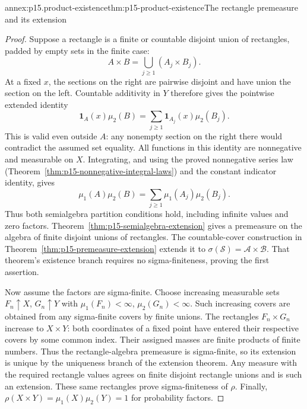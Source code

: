 \begin{annexitem}{annex:p15.product-existence}{thm:p15-product-existence}{The rectangle premeasure and its extension}
\begin{proof}
Suppose a rectangle is a finite or countable disjoint union of
rectangles, padded by empty sets in the finite case:
\[
 A\times B=\bigcup_{j\geq1}(A_j\times B_j).
\]
At a fixed \(x\), the sections on the right are pairwise disjoint
and have union the section on the left. Countable additivity in \(Y\)
therefore gives the pointwise extended identity
\[
 \mathbf1_A(x)\mu_2(B)
        =\sum_{j\geq1}\mathbf1_{A_j}(x)\mu_2(B_j).
\]
This is valid even outside \(A\): any nonempty section on the right
there would contradict the assumed set equality. All functions in this
identity are nonnegative and measurable on \(X\). Integrating, and
using the proved nonnegative series law
(Theorem~\ref{thm:p15-nonnegative-integral-laws}) and the constant
indicator identity, gives
\[
 \mu_1(A)\mu_2(B)
       =\sum_{j\geq1}\mu_1(A_j)\mu_2(B_j).
\]
Thus both semialgebra partition conditions hold, including infinite
values and zero factors. Theorem~\ref{thm:p15-semialgebra-extension}
gives a premeasure on the algebra of finite disjoint unions of rectangles.
The countable-cover construction in
Theorem~\ref{thm:p15-premeasure-extension} extends it to
\(\sigma(\mathcal S)=\mathcal A\times\mathcal B\). That theorem's
existence branch requires no sigma-finiteness, proving the first assertion.

Now assume the factors are sigma-finite. Choose increasing measurable
sets \(F_n\uparrow X\), \(G_n\uparrow Y\) with
\(\mu_1(F_n)<\infty\), \(\mu_2(G_n)<\infty\). Such increasing
covers are obtained from any sigma-finite covers by finite unions.
The rectangles \(F_n\times G_n\) increase to \(X\times Y\):
both coordinates of a fixed point have entered their respective covers
by some common index. Their assigned masses are finite products of
finite numbers. Thus the rectangle-algebra premeasure is sigma-finite,
so its extension is unique by the uniqueness branch of the extension
theorem. Any measure with the required rectangle values agrees on
finite disjoint rectangle unions and is such an extension. These same
rectangles prove sigma-finiteness of \(\rho\). Finally,
\(\rho(X\times Y)=\mu_1(X)\mu_2(Y)=1\) for probability factors.
\end{proof}
\end{annexitem}

